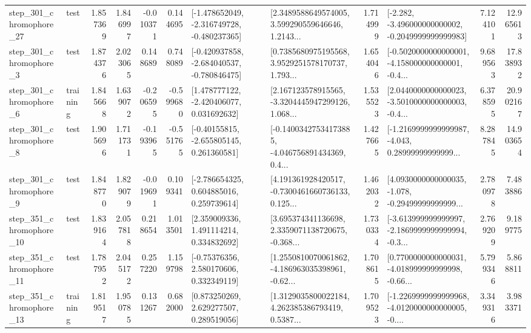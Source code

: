 \begin{tabular}{llrrrrllrlrr}
  step\_301\_chromophore\_27 &      test &      1.857369 &    1.846997 &     -0.010371 &  0.144695 &  [-1.478652049, -2.316749728, -0.480237365] &  [2.3489588649574005, 3.599290559646646, 1.2143... &       1.714999 &  [-2.282, -3.496000000000002, -0.2049999999999983] &            7.124101 &         12.965613 \\
   step\_301\_chromophore\_3 &      test &      1.874376 &    2.023065 &      0.148689 &  0.748089 &  [-0.420937858, -2.684040537, -0.780846475] &  [0.7385680975195568, 3.9529251578170737, 1.793... &       1.654046 &  [-0.5020000000000001, -4.158000000000001, -0.4... &            9.689563 &         17.838932 \\
   step\_301\_chromophore\_6 &  training &      1.845668 &    1.639072 &     -0.206595 & -0.599680 &    [1.478777122, -2.420406077, 0.031692632] &  [2.167123578915565, -3.3204445947299126, 1.068... &       1.535523 &  [2.0440000000000023, -3.5010000000000003, -0.4... &            6.378595 &         20.902167 \\
   step\_301\_chromophore\_8 &      test &      1.905696 &    1.711731 &     -0.193965 & -0.551765 &    [-0.40155815, -2.655805145, 0.261360581] &  [-0.14003427534173885, -4.046756891434369, 0.4... &       1.427665 &  [-1.2169999999999987, -4.043, 0.28999999999999... &            8.287845 &         14.903654 \\
   step\_301\_chromophore\_9 &      test &      1.848770 &    1.829079 &     -0.019691 &  0.109341 &    [-2.786654325, 0.604885016, 0.259739614] &  [4.191361928420517, -0.7300461660736133, 0.125... &       1.462032 &  [4.0930000000000035, -1.078, -0.29499999999999... &            2.780978 &          7.483886 \\
  step\_351\_chromophore\_10 &      test &      1.839164 &    2.057818 &      0.218654 &  1.013501 &     [2.359009336, 1.491114214, 0.334832692] &  [3.695374341136698, 2.3359071138720675, -0.368... &       1.730334 &  [-3.613999999999997, -2.1869999999999994, -0.3... &            2.769209 &          9.189775 \\
  step\_351\_chromophore\_11 &      test &      1.787952 &    2.045172 &      0.257220 &  1.159798 &     [-0.75376356, 2.580170606, 0.332349119] &  [1.2550810070061862, -4.186963035398961, -0.62... &       1.708615 &  [0.7700000000000031, -4.018999999999998, -0.66... &            5.799346 &          5.868811 \\
  step\_351\_chromophore\_13 &  training &      1.819517 &    1.950785 &      0.131267 &  0.682000 &     [0.873250269, 2.629277507, 0.289519056] &  [1.3129035800022184, 4.262385386793419, 0.5387... &       1.709523 &  [-1.2269999999999968, -4.0120000000000005, -0.... &            3.349316 &          3.983371 \\

\end{tabular}
